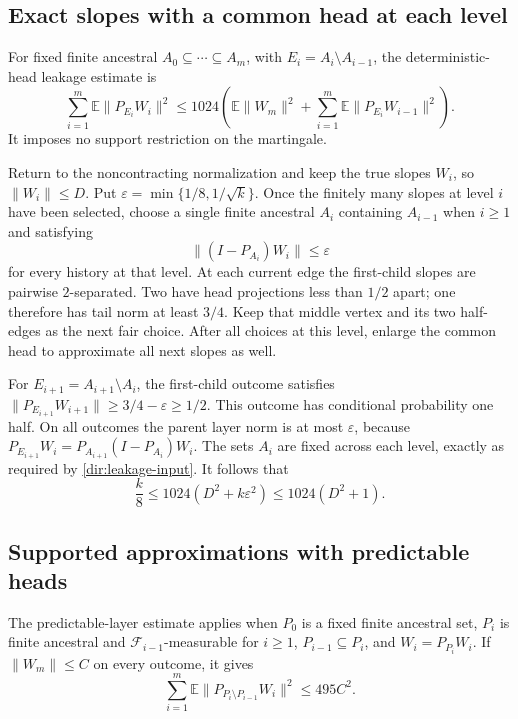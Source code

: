 \subsection{Exact slopes with a common head at each level}
\label{dir:deterministic-heads}
For fixed finite ancestral $A_0\subseteq\cdots\subseteq A_m$, with
$E_i=A_i\setminus A_{i-1}$, the deterministic-head leakage estimate
\cite[Theorem~6.5]{TreePotentials} is
\begin{equation}\label{dir:leakage-input}
 \sum_{i=1}^m\mathbb E\|P_{E_i}W_i\|^2
 \le1024\left(\mathbb E\|W_m\|^2+
                 \sum_{i=1}^m\mathbb E\|P_{E_i}W_{i-1}\|^2\right).
\end{equation}
It imposes no support restriction on the martingale.

Return to the noncontracting normalization and keep the true slopes
$W_i$, so $\|W_i\|\le D$.  Put
$\varepsilon=\min\{1/8,1/\sqrt{k}\}$.  Once the finitely many slopes at
level $i$ have been selected, choose a single finite ancestral $A_i$
containing $A_{i-1}$ when $i\ge1$ and satisfying
\[
 \|(I-P_{A_i})W_i\|\le\varepsilon
\]
for every history at that level.  At each current edge the first-child
slopes are pairwise $2$-separated.  Two have head projections less than
$1/2$ apart; one therefore has tail norm at least $3/4$.  Keep that
middle vertex and its two half-edges as the next fair choice.  After all
choices at this level, enlarge the common head to approximate all next
slopes as well.

For $E_{i+1}=A_{i+1}\setminus A_i$, the first-child outcome satisfies
$\|P_{E_{i+1}}W_{i+1}\|\ge3/4-\varepsilon\ge1/2$.  This outcome has
conditional probability one half.  On all outcomes the parent layer
norm is at most $\varepsilon$, because
$P_{E_{i+1}}W_i=P_{A_{i+1}}(I-P_{A_i})W_i$.
The sets $A_i$ are fixed across each level, exactly as required by
\eqref{dir:leakage-input}.  It follows that
\begin{equation}\label{dir:leakage-conclusion}
 \frac{k}{8}\le1024(D^2+k\varepsilon^2)
 \le1024(D^2+1).
\end{equation}

\subsection{Supported approximations with predictable heads}
\label{dir:predictable-application}
The predictable-layer estimate \cite[Theorem~6.1]{TreePotentials}
applies when $P_0$ is a fixed finite ancestral set,
$P_i$ is finite ancestral and $\mathcal F_{i-1}$-measurable for $i\ge1$,
$P_{i-1}\subseteq P_i$, and $W_i=P_{P_i}W_i$.  If
$\|W_m\|\le C$ on every outcome, it gives
\begin{equation}\label{dir:predictable-input}
 \sum_{i=1}^m\mathbb E\|P_{P_i\setminus P_{i-1}}W_i\|^2\le495C^2.
\end{equation}

